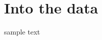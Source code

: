 \documentclass[book.tex]{subfiles}
\begin{document}
\part{Into the data}
sample text
\end{document}
